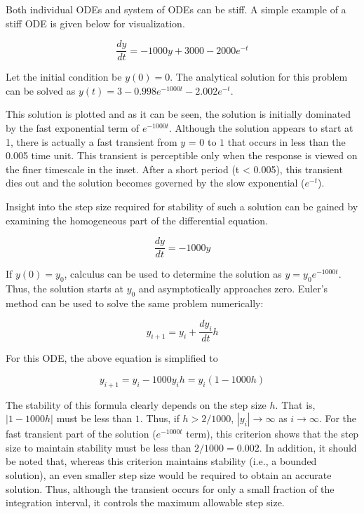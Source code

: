 \documentclass[book.tex]{subfiles}
\begin{document}
Both individual ODEs and system of ODEs can be stiff. A simple example of a stiff ODE is given below for visualization.

\begin{equation*}
	\frac{dy}{dt} = -1000y+3000-2000e^{-t}
\end{equation*}

Let the initial condition be $y(0)=0$. The analytical solution for this problem can be solved as $y(t) = 3 - 0.998e^{-1000t}-2.002e^{-t}$.


This solution is plotted and as it can be seen, the solution is initially dominated by the fast exponential term of $e^{-1000t}$. Although the solution appears to start at 1, there is actually a fast transient from $y$ = $0$ to $1$ that occurs in less than the 0.005 time unit. This transient is perceptible only when the response is viewed on the finer timescale in the inset. After a short period (t < 0.005), this transient dies out and the solution becomes governed by the slow exponential ($e^{-t}$). 

Insight into the step size required for stability of such a solution can be gained by examining the homogeneous part of the differential equation.

\begin{equation*}
\frac{dy}{dt} = -1000y
\end{equation*}

If $y(0)=y_0$, calculus can be used to determine the solution as $y = y_0e^{-1000t}$. Thus, the solution starts at $y_0$ and asymptotically approaches zero. Euler's method can be used to solve the same problem numerically:

\begin{equation*}
y_{i+1} = y_i + \dfrac{dy_i}{dt}h
\end{equation*}

For this ODE, the above equation is simplified to

\begin{equation*}
y_{i+1} = y_i -1000y_ih = y_i(1-1000h)
\end{equation*}

The stability of this formula clearly depends on the step size $h$.	That is, $|1-1000h|$ must be less than $1$. Thus, if $h>2/1000$, $|y_i| \rightarrow \infty$ as $i \rightarrow \infty$. For the fast transient part of the solution ($e^{-1000t}$ term), this criterion shows that the step size to maintain stability must be less than $2/1000 = 0.002$. In addition, it should be noted that, whereas this criterion maintains stability (i.e., a bounded solution), an even smaller step size would be required to obtain an accurate solution. Thus, although the transient occurs for only a small fraction of the integration interval, it controls the maximum allowable step size.
\end{document}
